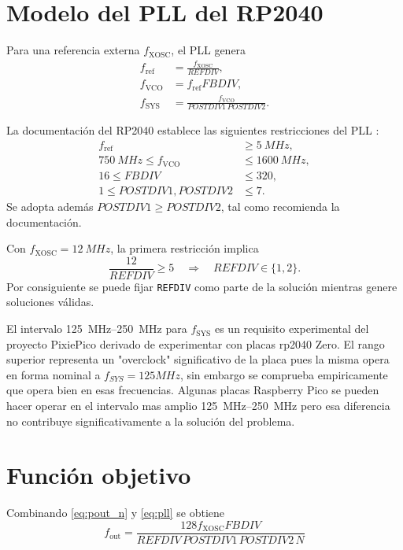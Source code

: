 \documentclass[11pt,a4paper]{article}
\begin{document}
\section{Modelo del PLL del RP2040}

Para una referencia externa \(f_{\mathrm{XOSC}}\), el PLL genera
\begin{align}
 f_{\mathrm{ref}} & = \frac{f_{\mathrm{XOSC}}}{REFDIV}, \\
 f_{\mathrm{VCO}} & = f_{\mathrm{ref}}FBDIV, \\
 f_{\mathrm{SYS}} & =
 \frac{f_{\mathrm{VCO}}}{POSTDIV1\,POSTDIV2}.
 \label{eq:pll}
\end{align}

La documentación del RP2040 establece las siguientes restricciones del PLL
\cite{rp2040datasheet}:
\begin{align}
 f_{\mathrm{ref}} &\ge \SI{5}{MHz}, \\
 \SI{750}{MHz}\le f_{\mathrm{VCO}}&\le\SI{1600}{MHz}, \\
 16\le FBDIV&\le320, \\
 1\le POSTDIV1,POSTDIV2&\le7.
\end{align}
Se adopta además \(POSTDIV1\ge POSTDIV2\), tal como recomienda la documentación.

Con \(f_{\mathrm{XOSC}}=\SI{12}{MHz}\), la primera restricción implica
\begin{equation}
 \frac{12}{REFDIV}\ge5
 \quad\Longrightarrow\quad
 \boxed{REFDIV\in\{1,2\}}.
\end{equation}
Por consiguiente se puede fijar \texttt{REFDIV} como parte de la solución mientras
genere soluciones válidas.

El intervalo \SIrange{125}{250}{MHz} para \(f_{\mathrm{SYS}}\) es un requisito
experimental del proyecto PixiePico derivado de experimentar con placas rp2040 Zero.
El rango superior representa un "overclock" significativo de la placa pues la misma
opera en forma nominal a $f_{SYS}=125 MHz$, sin embargo se comprueba empiricamente
que opera bien en esas frecuencias. Algunas placas Raspberry Pico se pueden hacer 
operar en el intervalo mas amplio \SIrange{125}{250}{MHz} pero esa diferencia no 
contribuye significativamente a la solución del problema. 

\section{Función objetivo}

Combinando \eqref{eq:pout_n} y \eqref{eq:pll} se obtiene
\begin{equation}
 \boxed{
 f_{\mathrm{out}}=
 \frac{128f_{\mathrm{XOSC}}FBDIV}
 {REFDIV\,POSTDIV1\,POSTDIV2\,N}}
 \label{eq:combined}
\end{equation}
\end{document}
